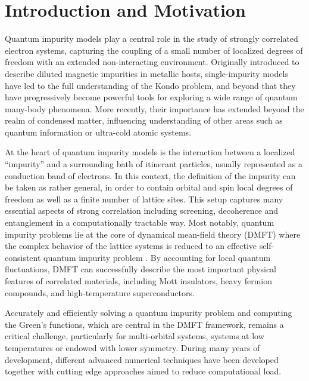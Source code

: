 \documentclass[edipack_sp.tex]{subfiles}
\begin{document}
\section{Introduction and Motivation}\label{SecIntro}
Quantum impurity models play a central role in the study of strongly correlated electron systems, capturing the coupling of a small number of localized degrees of freedom with an extended non-interacting environment.   
Originally introduced to describe diluted magnetic impurities in metallic hosts, single-impurity models have led to the full understanding of the Kondo problem, and beyond that they have progressively become powerful tools for exploring a wide range of quantum many-body phenomena. More recently, their importance has extended beyond the realm of condensed matter, influencing understanding of other areas such as quantum information or ultra-cold atomic systems.

At the heart of quantum impurity models is the interaction between a localized ``impurity''  and a surrounding bath of itinerant particles, usually represented as a conduction band of electrons. In this context, the definition of the impurity can be taken as rather general, in order to contain orbital and spin local degrees of freedom as well as a finite number of lattice sites. %
This setup captures many essential aspects of strong correlation including screening, decoherence and entanglement in a computationally tractable way. 
Most notably, quantum impurity problems lie at the core of dynamical mean-field theory (DMFT) where the complex behavior of the lattice systems is reduced to an effective self-consistent quantum impurity problem \cite{Georges1996RMP}.  
By accounting for local quantum fluctuations, DMFT can successfully describe the most important physical features of correlated materials, including Mott insulators, heavy fermion compounds, and high-temperature superconductors.  

Accurately and efficiently solving a quantum impurity problem and computing the Green's functions, which are central in the DMFT framework, remains a
critical challenge, particularly for multi-orbital systems, systems
at low temperatures or endowed with lower symmetry. During many years of development, different advanced numerical techniques have been developed together with cutting edge approaches aimed to reduce computational load.  
\end{document}
